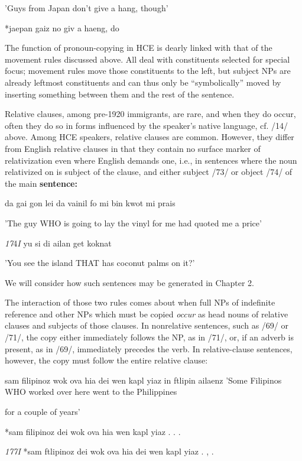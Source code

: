 'Guys from Japan don't give a hang, though'

\ea\label{ex:72}
 *jaepan gaiz no giv a haeng, do
\glt
\z

The function of pronoun-copying in HCE is dearly linked with that of the movement rules discussed above. All deal with constituents selected for special focus; movement rules move those constituents to the left, but subject NPs are already leftmost constituents and can thus only be ``symbolically'' moved by inserting something between them and the rest of the sentence.

Relative clauses, among pre-1920 immigrants, are rare, and when they do occur, often they do so in forms influenced by the speaker's native language, cf. /14/ above. Among HCE speakers, relative clauses are common. However, they differ from English relative clauses in that they contain no surface marker of relativization even where English demands one, i.e., in sentences where the noun relativized on is sub\-ject of the clause, and either subject /73/ or object /74/ of the main \textbf{sentence:} 

\ea\label{ex:73}
 da gai gon lei da vainil fo mi bin kwot mi prais
\glt
\z

'The guy WHO is going to lay the vinyl for me had quoted me a price'

\textit{17}4\textit{I }yu si di ailan get koknat

'You see the island THAT has coconut palms on it?'

We will consider how such sentences may be generated in Chapter 2.

The interaction of those two rules comes about when full NPs of indefinite reference and other NPs which must be copied \textit{occur }as head nouns of relative clauses and subjects of those clauses. In non\-relative sentences, such as /69/ or /71/, the copy either immediately follows the NP, as in /71/, or, if an adverb is present, as in /69/, immediately precedes the verb. In relative-clause sentences, however, the copy must follow the entire relative clause:

\ea\label{ex:75}
 sam filipinoz wok ova hia dei wen kapl yiaz in ftlipin ailaenz 'Some Filipinos WHO worked over here went to the Philippines
\glt
\z

for a couple of years'

\ea\label{ex:76}
 *sam filipinoz dei wok ova hia wen kapl yiaz . . .
\glt
\z

\textit{177I }*sam ftlipinoz dei wok ova hia dei wen kapl yiaz . , .

